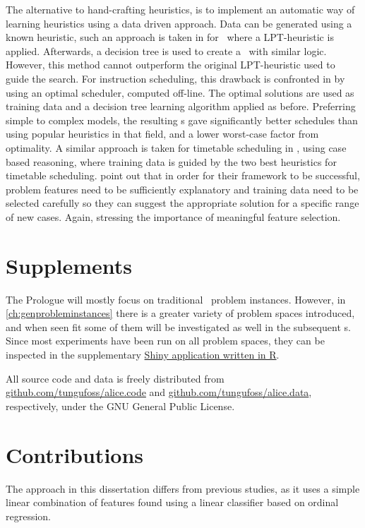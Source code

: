 The alternative to hand-crafting heuristics, is to implement an automatic way of learning heuristics using a data driven approach. %
Data can be generated using a known heuristic, such an approach is taken in 
\cite{Siggi05} for \jsp\, where a LPT-heuristic is applied. Afterwards, a 
decision tree is used to create a \dr\ with similar logic. However, this method 
cannot outperform the original LPT-heuristic used to guide the search. For 
instruction scheduling, this drawback is confronted in 
\citet{Malik08,Russell09,Siggi10} by using an optimal scheduler, computed 
off-line. The optimal solutions are used as training data and a decision tree 
learning algorithm applied as before. Preferring simple to complex models, the 
resulting \dr s gave significantly better schedules than using popular 
heuristics in that field, and a lower worst-case factor from optimality. A 
similar approach is taken for timetable scheduling in \cite{Burke06}, using 
case based reasoning, where training data is guided by the two best heuristics 
for timetable scheduling. 
\citeauthor{Burke06} point out that in order for their framework to be 
successful, problem features need to be sufficiently explanatory and training 
data need to be selected carefully so they can suggest the appropriate solution 
for a specific range of new cases. 
Again, stressing the importance of meaningful feature selection. 

\section{Supplements}
The Prologue will mostly focus on traditional \jsp\ problem instances. 
However, in \cref{ch:genprobleminstances} there is a greater variety of problem 
spaces introduced, and when seen fit some of them will be investigated as well 
in the subsequent s. 
Since most experiments have been run on all problem spaces, they can be 
inspected in the supplementary \href{http://tgax89.rhi.hi.is:3838/alice}{Shiny 
application written in R}. 

All source code and data is freely distributed from 
\url{github.com/tungufoss/alice.code} and 
\url{github.com/tungufoss/alice.data}, respectively, under the GNU 
General Public License.

\section{Contributions}
The approach in this dissertation differs from previous studies, as it uses a simple linear combination of features found using a linear classifier based on ordinal regression.  

